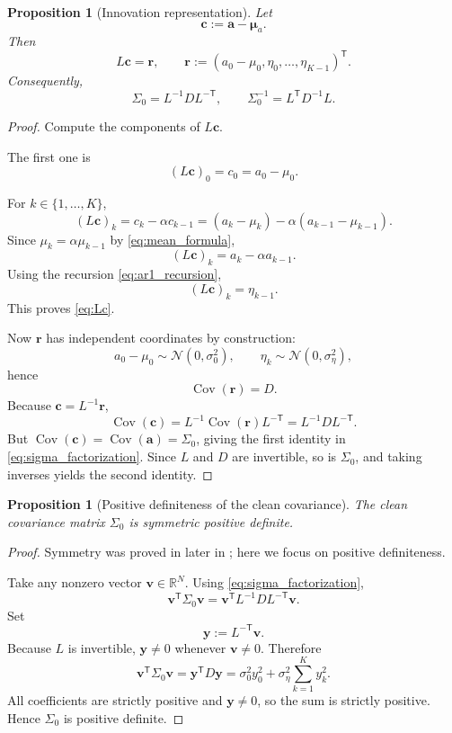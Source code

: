 \documentclass[11pt]{article}
\numberwithin{equation}{section}
\newtheorem{proposition}[theorem]{Proposition}
\theoremstyle{definition}
\theoremstyle{remark}
\newcommand{\R}{\mathbb{R}}
\newcommand{\Cov}{\operatorname{Cov}}
\newcommand{\trans}{\mathsf{T}}
\newcommand{\Ncal}{\mathcal{N}}
\begin{document}
\begin{proposition}[Innovation representation]\label{prop:innovation_representation}
Let
\[
\mathbf c:=\mathbf a-\boldsymbol{\mu}_a.
\]
Then
\begin{equation}\label{eq:Lc}
L\mathbf c = \mathbf r,
\qquad
\mathbf r:=(a_0-\mu_0,\eta_0,\dots,\eta_{K-1})^\trans.
\end{equation}
Consequently,
\begin{equation}\label{eq:sigma_factorization}
\Sigma_0 = L^{-1}DL^{-\trans},
\qquad
\Sigma_0^{-1}=L^\trans D^{-1}L.
\end{equation}
\end{proposition}

\begin{proof}
Compute the components of $L\mathbf c$.

The first one is
\[
(L\mathbf c)_0=c_0=a_0-\mu_0.
\]

For $k\in\{1,\dots,K\}$,
\[
(L\mathbf c)_k = c_k-\alpha c_{k-1}
=(a_k-\mu_k)-\alpha(a_{k-1}-\mu_{k-1}).
\]
Since $\mu_k=\alpha\mu_{k-1}$ by \eqref{eq:mean_formula},
\[
(L\mathbf c)_k=a_k-\alpha a_{k-1}.
\]
Using the recursion \eqref{eq:ar1_recursion},
\[
(L\mathbf c)_k=\eta_{k-1}.
\]
This proves \eqref{eq:Lc}.

Now $\mathbf r$ has independent coordinates by construction:
\[
a_0-\mu_0\sim \Ncal(0,\sigma_0^2),
\qquad
\eta_k\sim\Ncal(0,\sigma_\eta^2),
\]
hence
\[
\Cov(\mathbf r)=D.
\]
Because $\mathbf c=L^{-1}\mathbf r$,
\[
\Cov(\mathbf c)=L^{-1}\Cov(\mathbf r)L^{-\trans}=L^{-1}DL^{-\trans}.
\]
But $\Cov(\mathbf c)=\Cov(\mathbf a)=\Sigma_0$, giving the first identity in \eqref{eq:sigma_factorization}. Since $L$ and $D$ are invertible, so is $\Sigma_0$, and taking inverses yields the second identity.
\end{proof}

\begin{proposition}[Positive definiteness of the clean covariance]\label{prop:spd_sigma0}
The clean covariance matrix $\Sigma_0$ is symmetric positive definite.
\end{proposition}

\begin{proof}
Symmetry was proved in  later in ; here we focus on positive definiteness.

Take any nonzero vector $\mathbf v\in\R^N$. Using \eqref{eq:sigma_factorization},
\[
\mathbf v^\trans\Sigma_0\mathbf v
=
\mathbf v^\trans L^{-1}DL^{-\trans}\mathbf v.
\]
Set
\[
\mathbf y:=L^{-\trans}\mathbf v.
\]
Because $L$ is invertible, $\mathbf y\neq 0$ whenever $\mathbf v\neq 0$. Therefore
\[
\mathbf v^\trans\Sigma_0\mathbf v
=
\mathbf y^\trans D\mathbf y
=
\sigma_0^2 y_0^2+\sigma_\eta^2\sum_{k=1}^{K}y_k^2.
\]
All coefficients are strictly positive and $\mathbf y\neq 0$, so the sum is strictly positive. Hence $\Sigma_0$ is positive definite.
\end{proof}
\end{document}
